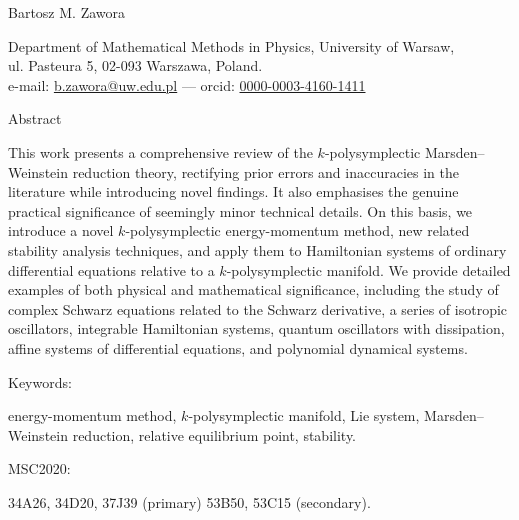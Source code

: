 \documentclass[11pt]{article}
\theoremstyle{plain}
\theoremstyle{definition}
\numberwithin{equation}{section}
\begin{document}
\bigskip

{\Large\raggedright\sffamily
    Bartosz M. Zawora
}\vspace{1mm}\newline
{\raggedright
    Department of Mathematical Methods in Physics, University of Warsaw,\\
    ul. Pasteura 5, 02-093 Warszawa, Poland.\\
    e-mail: \href{mailto:b.zawora@uw.edu.pl}{b.zawora@uw.edu.pl} --- orcid: \href{https://orcid.org/0000-0003-4160-1411}{0000-0003-4160-1411}
}

\vspace{3em}

{\large\bf\raggedright
    Abstract
}\vspace{1mm}\newline
{\raggedright
    This work presents a comprehensive review of the $k$-polysymplectic Marsden--Weinstein reduction theory, rectifying prior errors and inaccuracies in the literature while introducing novel findings. It also emphasises the genuine practical significance of seemingly minor technical details. On this basis, we introduce a novel $k$-polysymplectic energy-momentum method, new related stability analysis techniques, and apply them to Hamiltonian systems of ordinary differential equations relative to a $k$-polysymplectic manifold. We provide detailed examples of both physical and mathematical significance, including the study of complex Schwarz equations related to the Schwarz derivative, a series of isotropic oscillators, integrable Hamiltonian systems,  quantum oscillators with dissipation, affine systems of differential equations, and polynomial dynamical systems.
}
\bigskip

{\large\bf\raggedright
    Keywords:
}
energy-momentum method, $k$-polysymplectic manifold, Lie system, Marsden--Weinstein reduction, relative equilibrium point, stability. 
\medskip

{\large\bf\raggedright
    MSC2020:
}
34A26, %
34D20, %
37J39 (primary) %
53B50, %
53C15 (secondary). %
\end{document}
